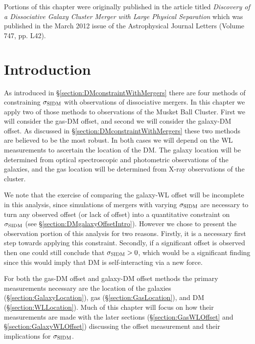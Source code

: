 \label{chapter:4}

\noindent Portions of this chapter were originally published in the article titled \emph{Discovery of a Dissociative Galaxy Cluster Merger with Large Physical Separation} which was published in the March 2012 issue of the Astrophysical Journal Letters (Volume 747, pp. L42). \\

\section{Introduction}

As introduced in \S\ref{section:DMconstraintWithMergers} there are four methods of constraining $\sigma_{\rm SIDM}$ with observations of dissociative mergers.
In this chapter we apply two of those methods to observations of the Musket Ball Cluster.
First we will consider the gas-DM offset, and second we will consider the galaxy-DM offset.
As discussed in \S\ref{section:DMconstraintWithMergers} these two methods are believed to be the most robust.
In both cases we will depend on the WL measurements to ascertain the location of the DM.
The galaxy location will be determined from optical spectroscopic and photometric observations of the galaxies, and the gas location will be determined from X-ray observations of the cluster.

We note that the exercise of comparing the galaxy-WL offset will be incomplete in this analysis, since simulations of mergers with varying $\sigma_{\rm SIDM}$ are necessary to turn any observed offset (or lack of offset) into a quantitative constraint on $\sigma_{\rm SIDM}$ (see \S\ref{section:DMgalaxyOffsetIntro}). 
However we chose to present the observation portion of this analysis for two reasons.
Firstly, it is a necessary first step towards applying this constraint.
Secondly, if a significant offset is observed then one could still conclude that $\sigma_{\rm SIDM}>0$, which would be a significant finding since this would imply that DM is self-interacting via a new force.

For both the gas-DM offset and galaxy-DM offset methods the primary measurements necessary are the location of the galaxies (\S\ref{section:GalaxyLocation}), gas (\S\ref{section:GasLocation}), and DM (\S\ref{section:WLLocation}).
Much of this chapter will focus on how their measurements are made with the later sections (\S\ref{section:GasWLOffset} and \S\ref{section:GalaxyWLOffset}) discussing the offset measurement and their implications for $\sigma_{\rm SIDM}$.


